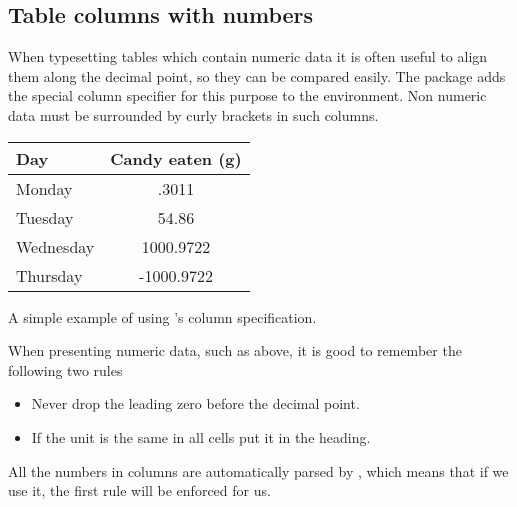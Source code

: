 \subsection{Table columns with numbers}\label{sec:sitables}

When typesetting tables which contain numeric data it is often useful to align
them along the decimal point, so they can be compared easily. The 
package adds the special column specifier  for this purpose to the
 environment. Non numeric data must be surrounded by curly brackets
in such columns.
\begin{listing}
  \begin{example}[examplewidth=0.7\linewidth, vertical_mode]
\begin{tabular}{@{}lS@{}}
  \toprule
  Day       & {Candy eaten (\unit{\g})} \\
  \midrule
  Monday    & .3011                     \\
  Tuesday   & 54.86                     \\
  Wednesday & 1000.9722                 \\
  Thursday  & -1000.9722                \\
  \bottomrule
\end{tabular}
\end{example}
  \caption{A simple example of using 's  column
    specification.}
\end{listing}

When presenting numeric data, such as above, it is good to remember the
following two rules
\begin{itemize}
  \item Never drop the leading zero before the decimal point.
  \item If the unit is the same in all cells put it in the heading.
\end{itemize}
All the numbers in  columns are automatically parsed by ,
which means that if we use it, the first rule will be enforced for us.

